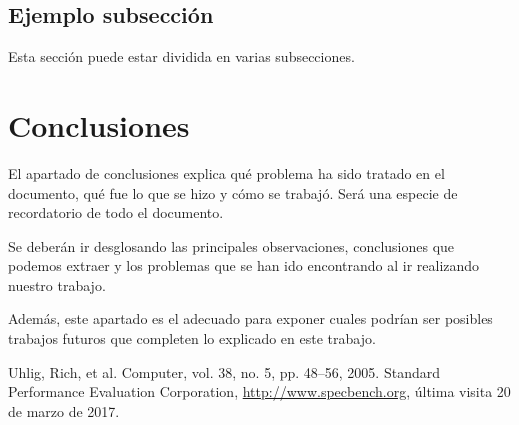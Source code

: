 \documentclass[a4paper,twocolumn]{article}
\begin{document}
\subsection{Ejemplo subsección}
Esta sección puede estar dividida en varias subsecciones. 
	
	
	
\section{Conclusiones}
	
El apartado de conclusiones explica qué problema ha sido tratado en el documento, qué fue lo que se hizo y cómo se trabajó. Será una especie de recordatorio de todo el documento.

Se deberán ir desglosando las principales observaciones, conclusiones que podemos extraer y los problemas que se han ido encontrando al ir realizando nuestro trabajo.

Además, este apartado es el adecuado para exponer cuales podrían ser posibles trabajos futuros que completen lo explicado en este trabajo. 

	
\begin{thebibliography}{99} %
		
    Uhlig, Rich, et al.
	\newblock Computer, vol. 38, no. 5, pp. 48--56, 2005.
	 Standard Performance Evaluation Corporation, 
	\newblock \href{http://www.specbench.org}{http://www.specbench.org}, 	\newblock [online] última visita 20 de marzo de 2017.
		
\end{thebibliography}
	
	
\end{document}
